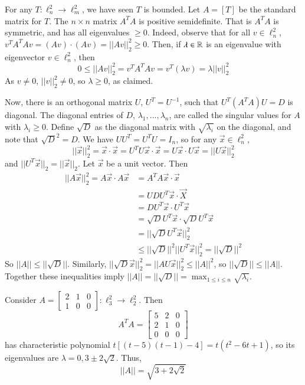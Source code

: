\begin{example}
    For any $T:\ell_n^2\rightarrow \ell_m^2$, we have seen $T$ is bounded. Let $A = [T]$ be the standard matrix for $T$. The $n\times n$ matrix $A^TA$ is positive semidefinite. That is $A^TA$ is symmetric, and has all eigenvalues $\geq 0$. Indeed, observe that for all $v \in \ell_n^2$, $v^TA^TAv = (Av)\cdot(Av) = ||Av||_2^2\geq 0$. Then, if $\lambda \in \mathbb R$ is an eigenvalue with eigenvector $v \in \ell_n^2$, then $$0 \leq ||Av||_2^2 = v^TA^TAv = v^T(\lambda v) = \lambda||v||_2^2$$ As $v\neq 0$, $||v||_2^2 \neq 0$, so $\lambda \geq 0$, as claimed. 

    Now, there is an orthogonal matrix $U$, $U^T = U^{-1}$, such that $U^T(A^TA)U = D$ is diagonal. The diagonal entries of $D$, $\lambda_1,...,\lambda_n$, are called the singular values for $A$ with $\lambda_i \geq 0$. Define $\sqrt{D}$ as the diagonal matrix with $\sqrt{\lambda_i}$ on the diagonal, and note that $\sqrt{D}^2 = D$. We have $UU^T = U^TU = I_n$, so for any $\vec{x} \in \ell_n^2$, $$||\vec{x}||_2^2 = \vec{x}\cdot\vec{x} = U^TU\vec{x}\cdot\vec{x} = U\vec{x}\cdot U\vec{x} = ||U\vec{x}||_2^2$$ and $||U^T\vec{x}||_2 = ||\vec{x}||_2$. Let $\vec{x}$ be a unit vector. Then \begin{align*}
        ||A\vec{x}||_2^2 = A\vec{x}\cdot A\vec{x} &= A^TA\vec{x}\cdot\vec{x} \\
        &= UDU^T\vec{x}\cdot \vec{X} \\
        &= DU^T\vec{x}\cdot U^T\vec{x} \\
        &= \sqrt{D}U^T\vec{x}\cdot\sqrt{D}U^T\vec{x} \\
        &= ||\sqrt{D}U^T\vec{x}||_2^2 \\
        &\leq ||\sqrt{D}||^2||U^T\vec{x}||_2^2 = ||\sqrt{D}||^2
    \end{align*}
    So $||A|| \leq ||\sqrt{D}||$. Similarly, $||\sqrt{D}\vec{x}||_2^2 = ||AU\vec{x}||_2^2\leq ||A||^2$, so $||\sqrt{D}||\leq ||A||$. Together these inequalities imply $||A|| = ||\sqrt{D}|| = \max_{1\leq i \leq n}\sqrt{\lambda_i}$.
\end{example}

\begin{example}
    Consider $A = \begin{bmatrix} 2 & 1 & 0 \\ 1 & 0 & 0\end{bmatrix}:\ell_3^2\rightarrow \ell_2^2$. Then $$A^TA = \begin{bmatrix} 5 & 2 & 0 \\ 2 & 1 & 0\\ 0 & 0 & 0 \end{bmatrix}$$ has characteristic polynomial $t[(t-5)(t-1)-4] = t(t^2-6t+1)$, so its eigenvalues are $\lambda = 0,3\pm 2\sqrt{2}$. Thus, $$||A|| = \sqrt{3+2\sqrt{2}}$$
\end{example}

